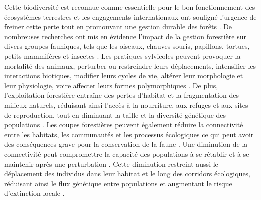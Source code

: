 Cette biodiversité est reconnue comme essentielle pour le bon fonctionnement des écosystèmes terrestres et les engagements internationaux ont souligné l'urgence de freiner cette perte tout en promouvant une gestion durable des forêts \citep{Scherer-Lorenzen2005ForestDiversity,Parviainen2007Maintenanceconservation,Newbold2015Globaleffects}. 
De nombreuses recherches ont mis en évidence l'impact de la gestion forestière sur divers groupes fauniques, tels que les oiseaux, chauves-souris, papillons, tortues, petits mammifères et insectes \citep{Summerville2011Managingforest, Currylow2012ShortTermForest, Kaminski2013EffectsForest, Kellner2013Shorttermresponses, Caldwell2019ComparisonBat}. 
Les pratiques sylvicoles peuvent provoquer la mortalité des animaux, perturber ou restreindre leurs déplacements, intensifier les interactions biotiques, modifier leurs cycles de vie, altérer leur morphologie et leur physiologie, voire affecter leurs formes polymorphiques \citep{Sergio2018Animalresponses}. 
De plus, l'exploitation forestière entraîne des pertes d'habitat et la fragmentation des milieux naturels, réduisant ainsi l'accès à la nourriture, aux refuges et aux sites de reproduction, tout en diminuant la taille et la diversité génétique des populations \citep{Bouderbala2023Longtermeffect}.
Les coupes forestières peuvent également réduire la connectivité entre les habitats, les communautés et les processus écologiques ce qui peut avoir des conséquences grave pour la conservation de la faune \citep{Lindenmayer2006Generalmanagement}. 
Une diminution de la connectivité peut compromettre la capacité des populations à se rétablir et à se maintenir après une perturbation \citep{Lamberson1994ReserveDesign}. 
Cette diminution restreint aussi le déplacement des individus dans leur habitat et le long des corridors écologiques, réduisant ainsi le flux génétique entre populations et augmentant le risque d'extinction locale \citep{Saccheri1998Inbreedingextinction}.

